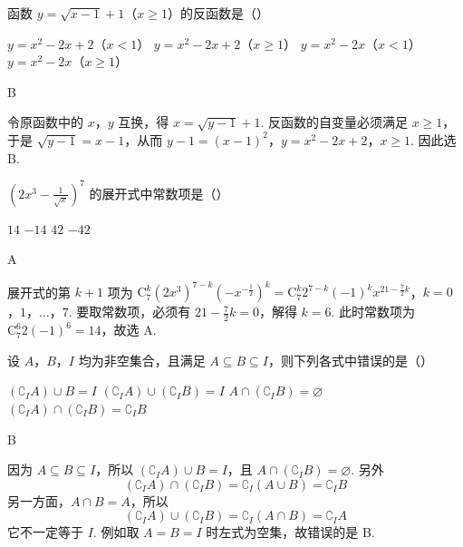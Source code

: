 \begin{problem}
函数 \(y = \sqrt{x - 1} + 1\)（\(x \geqslant 1\)）的反函数是（\quad）

\choices
    {\(y = x^{2} - 2x + 2\)（\(x < 1\)）}
    {\(y = x^{2} - 2x + 2\)（\(x \geqslant 1\)）}
    {\(y = x^{2} - 2x\)（\(x < 1\)）}
    {\(y = x^{2} - 2x\)（\(x \geqslant 1\)）}
\end{problem}

\begin{answer}
B
\end{answer}

\begin{solution}
令原函数中的 \(x\)，\(y\) 互换，得 \(x=\sqrt{y-1}+1\). 反函数的自变量必须满足 \(x\geqslant1\)，于是 \(\sqrt{y-1}=x-1\)，从而
\(y-1=(x-1)^2\)，\(y=x^2-2x+2\)，\(x\geqslant1\).
因此选 B.
\end{solution}

\begin{problem}
\(\left(2x^{3} - \frac{1}{\sqrt{x}}\right)^7\) 的展开式中常数项是（\quad）

\choices
    {\(14\)}
    {\(-14\)}
    {\(42\)}
    {\(-42\)}
\end{problem}

\begin{answer}
A
\end{answer}

\begin{solution}
展开式的第 \(k+1\) 项为
\(\mathrm C_7^k(2x^3)^{7-k}\left(-x^{-\frac12}\right)^k=\mathrm C_7^k2^{7-k}(-1)^kx^{21-\frac72k}\)，\(k=0\)，\(1\)，\(\ldots\)，\(7\).
要取常数项，必须有 \(21-\frac72k=0\)，解得 \(k=6\). 此时常数项为 \(\mathrm C_7^6 2(-1)^6=14\)，故选 A.
\end{solution}

\begin{problem}
设 \(A\)，\(B\)，\(I\) 均为非空集合，且满足 \(A \subseteq B \subseteq I\)，则下列各式中错误的是（\quad）

\choices
    {\((\complement_{I} A) \cup B = I\)}
    {\((\complement_{I} A) \cup (\complement_{I} B) = I\)}
    {\(A \cap (\complement_{I} B) = \varnothing\)}
    {\((\complement_{I} A) \cap (\complement_{I} B) = \complement_{I} B\)}
\end{problem}

\begin{answer}
B
\end{answer}

\begin{solution}
因为 \(A\subseteq B\subseteq I\)，所以 \((\complement_I A)\cup B=I\)，且 \(A\cap(\complement_I B)=\varnothing\). 另外
\[
(\complement_I A)\cap(\complement_I B)=\complement_I(A\cup B)=\complement_I B
\]
另一方面，\(A\cap B=A\)，所以
\[
(\complement_I A)\cup(\complement_I B)=\complement_I(A\cap B)=\complement_I A
\]
它不一定等于 \(I\). 例如取 \(A=B=I\) 时左式为空集，故错误的是 B.
\end{solution}

